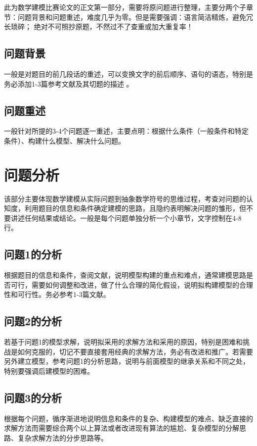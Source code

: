 \documentclass[12pt,utf8]{article}
\begin{document}
此为数学建模比赛论文的正文第一部分，需要将原问题进行整理，主要分两个子章节：问题背景和问题重述，难度几乎为零。但是需要强调：语言简洁精炼，避免冗长琐碎；
绝对不可照抄原题，不然过不了查重或加大重复率！

\subsection{问题背景}
   一般是对题目的前几段话的重述，可以变换文字的前后顺序、语句的语态，特别是务必添加1-3篇参考文献\cite{Sample}及其切题的描述 。
\subsection{问题重述}
   一般针对所提的3-4个问题逐一重述，主要点明：根据什么条件（一般条件和特定条件）、构建什么模型、解决什么问题。

\section{问题分析}

该部分主要体现数学建模从实际问题到抽象数学符号的思维过程，考查对问题的认知度，利用题目的信息和条件确定建模的思路，且隐约表明解决问题的雏形，但不要讲述任何结果或结论。一般是每个问题单独分析一个小章节，文字控制在4-8行。

\subsection{问题1的分析}
根据题目的信息和条件，查阅文献，说明模型构建的重点和难点，通常建模思路是否可行，需要如何调整和改进，做了什么合理的简化假设，说明拟构建模型的合理性和可行性。务必参考1-3篇文献。

\subsection{问题2的分析}
若基于问题1的模型求解，说明拟采用的求解方法和采用的原因，特别是困难和挑战是如何克服的，切记不要直接套用经典的求解方法，务必有改进和推广。若需要另外建立模型，参考问题1的分析思路，说明与前面模型的继承关系和不同之处，特别要强调后建模型的困难。

\subsection{问题3的分析}

根据每个问题，循序渐进地说明信息和条件的复杂、构建模型的难点、缺乏直接的求解方法而需要综合两个以上算法或者改进现有算法的尴尬、复杂模型的分解思路、复杂求解方法的分步思路等。
\end{document}
